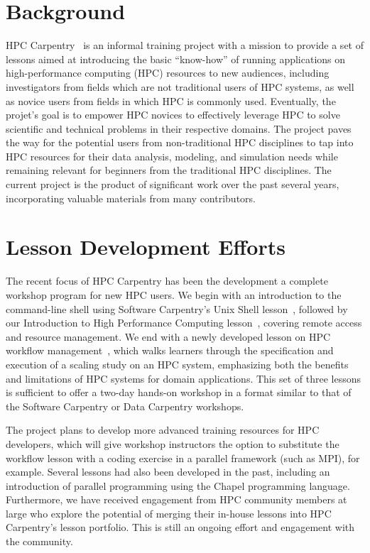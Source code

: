 \section{Background}

HPC Carpentry~\cite{HPCC-website} is an informal training project with a mission to provide a set of lessons aimed at introducing the basic ``know-how'' of running applications on high-performance computing (HPC) resources to new audiences, including investigators from fields which are not traditional users of HPC systems, as well as novice users from fields in which HPC is commonly used.
Eventually, the projet's goal is to empower HPC novices to effectively leverage HPC to solve scientific and technical problems in their respective domains.
The project paves the way for the potential users from non-traditional HPC disciplines to tap into HPC resources for their data analysis, modeling, and simulation needs while remaining relevant for beginners from the traditional HPC disciplines.
The current project is the product of significant work over the past several years, incorporating valuable materials from many contributors.



\section{Lesson Development Efforts}

The recent focus of HPC Carpentry has been the development a complete workshop program for new HPC users.
We begin with an introduction to the command-line shell using Software Carpentry's Unix Shell lesson~\cite{SwC-UNIX-Shell_v3},
followed by our Introduction to High Performance Computing lesson~\cite{HPCC_hpc-intro}, covering remote access and resource management.
We end with a newly developed lesson on HPC workflow management~\cite{HPCC_hpc-workflows}, which walks learners through the specification and execution of a scaling study on an HPC system, emphasizing both the benefits and limitations of HPC systems for domain applications. 
This set of three lessons is sufficient to offer a two-day hands-on workshop in a format similar to that of the Software Carpentry or Data Carpentry workshops.

The project plans to develop more advanced training resources for HPC developers, which will give workshop instructors the option to substitute the workflow lesson with a coding exercise in a parallel framework (such as MPI), for example.
Several lessons had also been developed in the past, including an introduction of parallel programming using the Chapel programming language.
Furthermore, we have received engagement from HPC community members at large who explore the potential of merging their in-house lessons into HPC Carpentry's lesson portfolio.
This is still an ongoing effort and engagement with the community.


